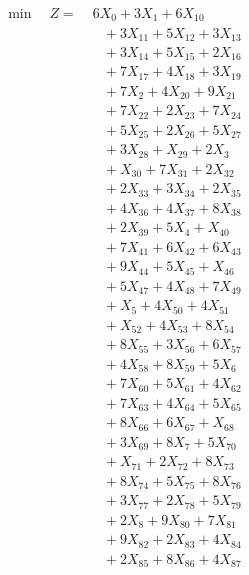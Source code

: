 \documentclass[a4paper,10pt]{article}
\begin{document}
\allowdisplaybreaks
{\small
\begin{align}
\min \quad Z = &\; 6X_{0} + 3X_{1} + 6X_{10} \\[0.5ex]
&\quad  + 3X_{11} + 5X_{12} + 3X_{13} \\[0.5ex]
&\quad  + 3X_{14} + 5X_{15} + 2X_{16} \\[0.5ex]
&\quad  + 7X_{17} + 4X_{18} + 3X_{19} \\[0.5ex]
&\quad  + 7X_{2} + 4X_{20} + 9X_{21} \\[0.5ex]
&\quad  + 7X_{22} + 2X_{23} + 7X_{24} \\[0.5ex]
&\quad  + 5X_{25} + 2X_{26} + 5X_{27} \\[0.5ex]
&\quad  + 3X_{28} + X_{29} + 2X_{3} \\[0.5ex]
&\quad  + X_{30} + 7X_{31} + 2X_{32} \\[0.5ex]
&\quad  + 2X_{33} + 3X_{34} + 2X_{35} \\[0.5ex]
&\quad  + 4X_{36} + 4X_{37} + 8X_{38} \\[0.5ex]
&\quad  + 2X_{39} + 5X_{4} + X_{40} \\[0.5ex]
&\quad  + 7X_{41} + 6X_{42} + 6X_{43} \\[0.5ex]
&\quad  + 9X_{44} + 5X_{45} + X_{46} \\[0.5ex]
&\quad  + 5X_{47} + 4X_{48} + 7X_{49} \\[0.5ex]
&\quad  + X_{5} + 4X_{50} + 4X_{51} \\[0.5ex]
&\quad  + X_{52} + 4X_{53} + 8X_{54} \\[0.5ex]
&\quad  + 8X_{55} + 3X_{56} + 6X_{57} \\[0.5ex]
&\quad  + 4X_{58} + 8X_{59} + 5X_{6} \\[0.5ex]
&\quad  + 7X_{60} + 5X_{61} + 4X_{62} \\[0.5ex]
&\quad  + 7X_{63} + 4X_{64} + 5X_{65} \\[0.5ex]
&\quad  + 8X_{66} + 6X_{67} + X_{68} \\[0.5ex]
&\quad  + 3X_{69} + 8X_{7} + 5X_{70} \\[0.5ex]
&\quad  + X_{71} + 2X_{72} + 8X_{73} \\[0.5ex]
&\quad  + 8X_{74} + 5X_{75} + 8X_{76} \\[0.5ex]
&\quad  + 3X_{77} + 2X_{78} + 5X_{79} \\[0.5ex]
&\quad  + 2X_{8} + 9X_{80} + 7X_{81} \\[0.5ex]
&\quad  + 9X_{82} + 2X_{83} + 4X_{84} \\[0.5ex]
&\quad  + 2X_{85} + 8X_{86} + 4X_{87} \\[0.5ex]

\end{align}}
\end{document}
